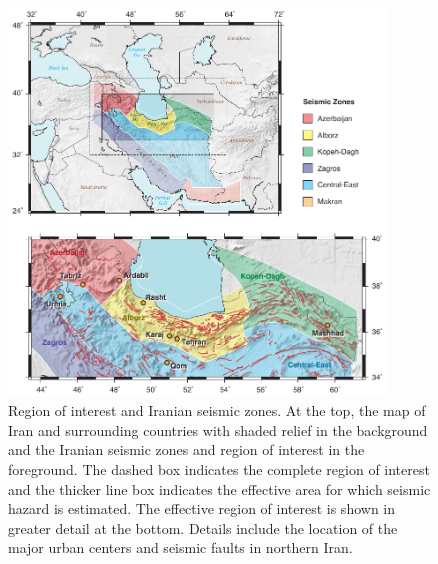 
\begin{figure}[t] 
	\centering
	\includegraphics[width=0.9\textwidth]{figures/pdf/figure-01}
	\caption{Region of interest and Iranian seismic zones. At the top, the map of Iran and surrounding countries with shaded relief in the background and the Iranian seismic zones \citep[after][]{Karimiparidari2013} and region of interest in the foreground. The dashed box indicates the complete region of interest and the thicker line box indicates the effective area for which seismic hazard is estimated. The effective region of interest is shown in greater detail at the bottom. Details include the location of the major urban centers and seismic faults in northern Iran.}
	\label{fig:iran}
\end{figure}

